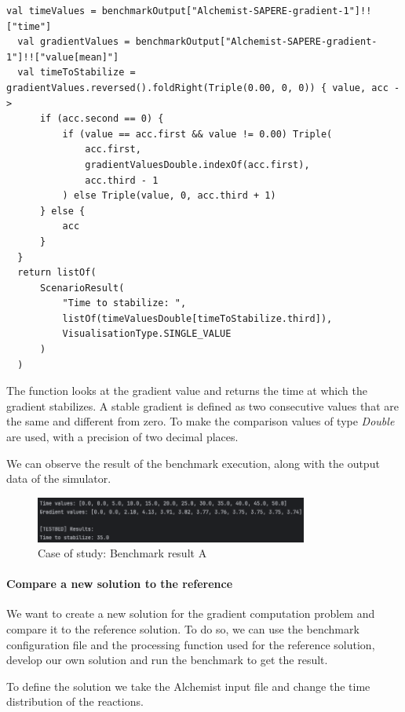 \documentclass[12pt,a4paper,openright,twoside]{book}
\begin{document}
\lstset{style=my-kotlin}
\begin{lstlisting}[language=my-kotlin, caption={Case of study: Output processing function.}]
  val timeValues = benchmarkOutput["Alchemist-SAPERE-gradient-1"]!!["time"]
  val gradientValues = benchmarkOutput["Alchemist-SAPERE-gradient-1"]!!["value[mean]"]
  val timeToStabilize = gradientValues.reversed().foldRight(Triple(0.00, 0, 0)) { value, acc ->
      if (acc.second == 0) {
          if (value == acc.first && value != 0.00) Triple(
              acc.first,
              gradientValuesDouble.indexOf(acc.first),
              acc.third - 1
          ) else Triple(value, 0, acc.third + 1)
      } else {
          acc
      }
  }
  return listOf(
      ScenarioResult(
          "Time to stabilize: ",
          listOf(timeValuesDouble[timeToStabilize.third]),
          VisualisationType.SINGLE_VALUE
      )
  )
\end{lstlisting}

The function looks at the gradient value and returns the time at which the gradient stabilizes.
A stable gradient is defined as two consecutive values that are the same and different from zero.
To make the comparison values of type \textit{Double} are used, with a precision of two decimal places.

We can observe the result of the benchmark execution, along with the output data of the simulator.

\begin{figure}[H]
  \centering
  \includegraphics[width=0.8\textwidth]{figures/result-A.png}
  \caption{Case of study: Benchmark result A}
\end{figure}

\paragraph*{Compare a new solution to the reference}

We want to create a new solution for the gradient computation problem and compare it to the reference solution.
To do so, we can use the benchmark configuration file and the processing function used for the reference solution,
develop our own solution and run the benchmark to get the result.

To define the solution we take the Alchemist input file and change the time distribution of the reactions.
\end{document}
